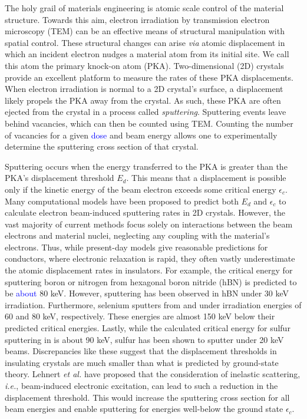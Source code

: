 \documentclass[twoside,twocolumn,9pt]{article}
\begin{document}
The holy grail of materials engineering is atomic scale control of the
material structure.
Towards this aim, electron irradiation by transmission electron microscopy
(TEM) can be an effective means of structural manipulation with spatial
control.\cite{Banhart1999, Egerton2013, Zhao2017, Susi2019}
These structural changes can arise \textit{via} atomic displacement in which an
incident electron nudges a material atom from its initial site.
We call this atom the primary knock-on atom (PKA).
Two-dimensional (2D) crystals provide an excellent platform to measure the
rates of these PKA displacements.
When electron irradiation is normal to a 2D crystal's surface, a displacement
likely propels the PKA away from the crystal.
As such, these PKA are often ejected from the crystal in a process called
\textit{sputtering}.
Sputtering events leave behind vacancies, which can then be counted using TEM.
Counting the number of vacancies for a given \textcolor{blue}{dose} and beam
energy allows one to experimentally determine the sputtering cross section of
that crystal.

Sputtering occurs when the energy transferred to the PKA is greater than
the PKA's displacement threshold $E_d$.
This means that a displacement is possible only if the kinetic energy of the
beam electron exceeds some critical energy $\epsilon_c$.
Many computational models have been proposed to predict both $E_d$ and
$\epsilon_c$ to calculate electron beam-induced sputtering rates in 2D
crystals.\cite{Meyer2012, Susi2016, Yoshimura2018, Susi2019}
However, the vast majority of current methods focus solely on interactions
between the beam electrons and material nuclei, neglecting any coupling with
the material's electrons.
Thus, while present-day models give reasonable predictions for
conductors,\cite{Meyer2012} where electronic relaxation is rapid, they often
vastly underestimate the atomic displacement rates in insulators.
For example, the critical energy for sputtering boron or nitrogen from
hexagonal boron nitride (hBN) is predicted to be \textcolor{blue}{about} 80
keV.\cite{Kotakoski2010}
However, sputtering has been observed in hBN under 30 keV
irradiation.\cite{Cretu2015}
Furthermore, selenium sputters from  and  under irradiation
energies of 60 and 80 keV, respectively.  These energies are almost 150 keV
below their predicted critical energies.\cite{Lin2015, Lehnert2017}
Lastly, while the calculated critical energy for sulfur sputtering in 
is about 90 keV, sulfur has been shown to sputter under 20 keV
beams.\cite{Kretschmer2020}
Discrepancies like these suggest that the displacement thresholds in insulating
crystals are much smaller than what is predicted by ground-state theory.
Lehnert \textit{et al.}  have proposed that the consideration of inelastic scattering,
\textit{i.e.}, beam-induced electronic excitation, can lead to such a reduction in the
displacement threshold.\cite{Lehnert2017}
This would increase the sputtering cross section for all beam energies and
enable sputtering for energies well-below the ground state $\epsilon_c$.
\end{document}

